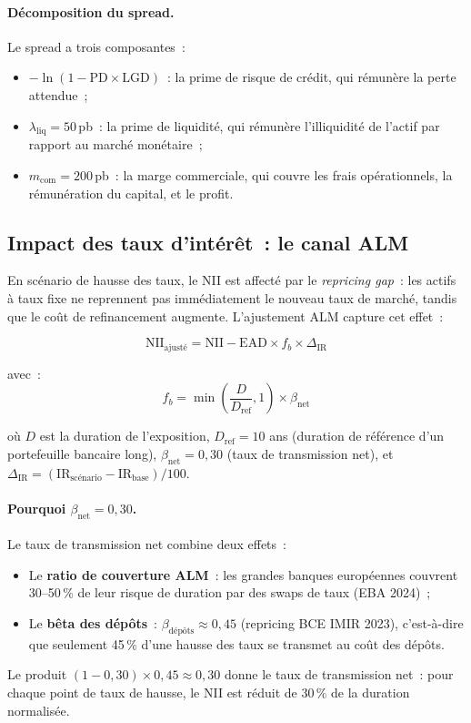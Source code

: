 \documentclass[12pt, a4paper, twoside, openright]{report}
\theoremstyle{definition}
\begin{document}
\paragraph{Décomposition du spread.} Le spread a trois composantes~:
\begin{itemize}[nosep]
  \item $-\ln(1 - \text{PD} \times \text{LGD})$~: la prime de risque de crédit, qui rémunère la perte attendue~;
  \item $\lambda_{\text{liq}} = 50$\,pb~: la prime de liquidité, qui rémunère l'illiquidité de l'actif par rapport au marché monétaire~;
  \item $m_{\text{com}} = 200$\,pb~: la marge commerciale, qui couvre les frais opérationnels, la rémunération du capital, et le profit.
\end{itemize}

\subsection{Impact des taux d'intérêt~: le canal ALM}

En scénario de hausse des taux, le NII est affecté par le \emph{repricing gap}~: les actifs à taux fixe ne reprennent pas immédiatement le nouveau taux de marché, tandis que le coût de refinancement augmente. L'ajustement ALM capture cet effet~:

\begin{equation}
\text{NII}_{\text{ajusté}} = \text{NII} - \text{EAD} \times f_b \times \Delta_{\text{IR}}
\label{eq:nii-alm}
\end{equation}

\noindent avec~:
\begin{equation}
f_b = \min\!\left(\frac{D}{D_{\text{ref}}}, 1\right) \times \beta_{\text{net}}
\label{eq:fb}
\end{equation}

\noindent où $D$ est la duration de l'exposition, $D_{\text{ref}} = 10$ ans (duration de référence d'un portefeuille bancaire long), $\beta_{\text{net}} = 0{,}30$ (taux de transmission net), et $\Delta_{\text{IR}} = (\text{IR}_{\text{scénario}} - \text{IR}_{\text{base}}) / 100$.

\paragraph{Pourquoi $\beta_{\text{net}} = 0{,}30$.} Le taux de transmission net combine deux effets~:
\begin{itemize}[nosep]
  \item Le \textbf{ratio de couverture ALM}~: les grandes banques européennes couvrent 30--50\,\% de leur risque de duration par des swaps de taux (EBA 2024)~;
  \item Le \textbf{bêta des dépôts}~: $\beta_{\text{dépôts}} \approx 0{,}45$ (repricing BCE IMIR 2023), c'est-à-dire que seulement 45\,\% d'une hausse des taux se transmet au coût des dépôts.
\end{itemize}
Le produit $(1 - 0{,}30) \times 0{,}45 \approx 0{,}30$ donne le taux de transmission net~: pour chaque point de taux de hausse, le NII est réduit de 30\,\% de la duration normalisée.
\end{document}
